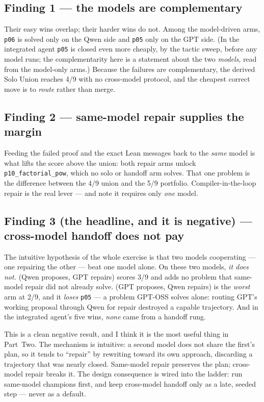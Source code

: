 \subsection{Finding 1 --- the models are complementary}
Their easy wins overlap; their harder wins do not. Among the model-driven arms,
\texttt{p06} is solved only on the Qwen side and \texttt{p05} only on the GPT side.
(In the integrated agent \texttt{p05} is closed even more cheaply, by the tactic
sweep, before any model runs; the complementarity here is a statement about the
two \emph{models}, read from the model-only arms.) Because the failures are
complementary, the derived Solo Union reaches 4/9 with no cross-model protocol,
and the cheapest correct move is to \emph{route} rather than merge.

\subsection{Finding 2 --- same-model repair supplies the margin}
Feeding the failed proof and the exact Lean messages back to the \emph{same} model
is what lifts the score above the union: both repair arms unlock
\texttt{p10\_factorial\_pow}, which no solo or handoff arm solves. That one problem
is the difference between the 4/9 union and the 5/9 portfolio. Compiler-in-the-loop
repair is the real lever --- and note it requires only \emph{one} model.

\subsection{Finding 3 (the headline, and it is negative) --- cross-model handoff
does not pay}
The intuitive hypothesis of the whole exercise is that two models cooperating ---
one repairing the other --- beat one model alone. On these two models, \emph{it
does not.} \HQG{} (Qwen proposes, GPT repairs) scores 3/9 and adds no problem that
same-model repair did not already solve. \HGQ{} (GPT proposes, Qwen repairs) is the
\emph{worst} arm at 2/9, and it \emph{loses} \texttt{p05} --- a problem GPT-OSS
solves alone: routing GPT's working proposal through Qwen for repair destroyed a
capable trajectory. And in the integrated agent's five wins, \emph{none} came from
a handoff rung.

This is a clean negative result, and I think it is the most useful thing in
Part~Two. The mechanism is intuitive: a second model does not share the first's
plan, so it tends to ``repair'' by rewriting toward its own approach, discarding a
trajectory that was nearly closed. Same-model repair preserves the plan; cross-
model repair breaks it. The design consequence is wired into the ladder: run
same-model champions first, and keep cross-model handoff only as a late, seeded
step --- never as a default.

